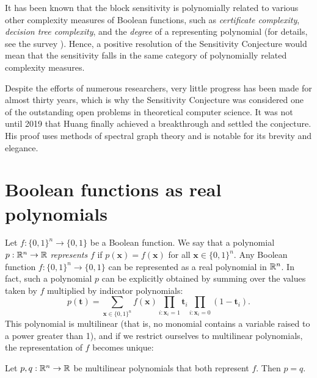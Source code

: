 It has been known that the block sensitivity is polynomially related to various other complexity measures of Boolean functions, such as \textit{certificate complexity}, \textit{decision tree complexity}, and the \textit{degree} of a representing polynomial (for details, see the survey \cite{buhrmanndewolf}).
Hence, a positive resolution of the Sensitivity Conjecture would mean that the sensitivity falls in the same category of polynomially related complexity measures.

Despite the efforts of numerous researchers, very little progress has been made for almost thirty years, which is why the Sensitivity Conjecture was considered one of the outstanding open problems in theoretical computer science.
It was not until 2019 that Huang \cite{sensitivity} finally achieved a breakthrough and settled the conjecture.
His proof uses methods of spectral graph theory and is notable for its brevity and elegance.

\section{Boolean functions as real polynomials}
Let $f: \{0, 1\}^n \rightarrow \{0, 1 \}$ be a Boolean function. 
We say that a polynomial $p: \mathbb{R}^n \rightarrow \mathbb{R}$ \textit{represents} $f$ if $p(\bm{x}) = f(\bm{x})$ for all $\bm{x} \in \{0, 1\}^n$.
Any Boolean function $f: \{0, 1\}^n \rightarrow \{0, 1 \}$ can be represented as a real polynomial in $\mathbb{R}^n$.
In fact, such a polynomial $p$ can be explicitly obtained by summing over the values taken by $f$ multiplied by indicator polynomials:
\begin{equation*}
    p(\bm{t}) = \sum \limits_{\bm{x} \in \{0, 1\}^n} f(\bm{x})  \prod \limits_{i: \bm{x}_i = 1} \bm{t}_i \prod \limits_{i: \bm{x}_i = 0} (1 - \bm{t}_i  ).
\end{equation*}
This polynomial is multilinear (that is, no monomial contains a variable raised to a power greater than 1), and if we restrict ourselves to multilinear polynomials, the representation of $f$ becomes unique:

\begin{lemma}
    Let $p, q : \mathbb{R}^n \rightarrow \mathbb{R}$ be multilinear polynomials that both represent $f$. Then $p = q$. 
\end{lemma}

